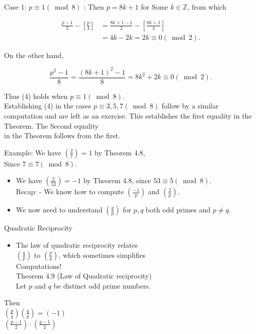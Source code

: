 \documentclass[10pt]{article}
\begin{document}
Case 1: $p \equiv 1(\bmod 8)$ : Then $p=8 k+1$ for Some $k \in \mathbb{Z}$, from which

$$
\begin{aligned}
\frac{p-1}{2}-\left[\frac{p}{4}\right] & =\frac{8 k+1-1}{2}-\left[\frac{8 k+1}{4}\right] \\
& =4 k-2 k=2 k \equiv 0(\bmod 2) .
\end{aligned}
$$

On the other hand,

$$
\frac{p^{2}-1}{8}=\frac{(8 k+1)^{2}-1}{8}=8 k^{2}+2 k \equiv 0(\bmod 2) .
$$

Thus (4) holds when $p \equiv 1(\bmod 8)$.\\
Establishing (4) in the cases $p \equiv 3,5,7(\bmod 8)$ follow by a similar computation and are left as an exercise. This establishes the first equality in the Theorem. The Second equality\\
in the Theorem follows from the first.

Example: We have $\left(\frac{2}{7}\right)=1$ by Theorem 4.8,\\
Since $7 \equiv 7(\bmod 8)$.

\begin{itemize}
  \item We have $\left(\frac{2}{53}\right)=-1$ by Theorem 4.8, since $53 \equiv 5(\bmod 8)$.\\
Recap: - We know how to compute $\left(\frac{-1}{p}\right)$ and $\left(\frac{2}{p}\right)$.
  \item We now need to understand $\left(\frac{q}{p}\right)$ for $p, q$ both odd primes and $p \neq q$.
\end{itemize}

Quadratic Reciprocity

\begin{itemize}
  \item The law of quadratic reciprocity relates\\
$\left(\frac{q}{p}\right)$ to $\left(\frac{p}{q}\right)$, which sometimes simplifies\\
Computations!\\
Theorem 4.9 (Law of Quadratic reciprocity)\\
Let $p$ and $q$ be distinct odd prime numbers.
\end{itemize}

Then\\
$\left(\frac{p}{q}\right)\left(\frac{q}{p}\right)=(-1)$\\
$\left(\frac{p-1}{2}\right) \cdot\left(\frac{q-1}{2}\right)$
\end{document}
